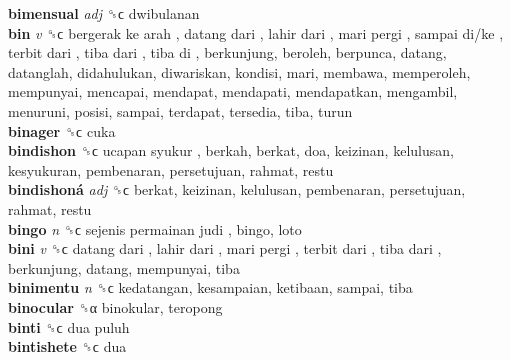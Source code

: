 \textbf{bimensual} \emph{adj}  ␝ϲ  dwibulanan  \\
\textbf{bin} \emph{v}  ␝ϲ   bergerak ke arah ,  datang dari ,  lahir dari ,  mari pergi ,  sampai di/ke ,  terbit dari ,  tiba dari ,  tiba di , berkunjung, beroleh, berpunca, datang, datanglah, didahulukan, diwariskan, kondisi, mari, membawa, memperoleh, mempunyai, mencapai, mendapat, mendapati, mendapatkan, mengambil, menuruni, posisi, sampai, terdapat, tersedia, tiba, turun  \\
\textbf{binager} ␝ϲ  cuka  \\
\textbf{bindishon} ␝ϲ   ucapan syukur , berkah, berkat, doa, keizinan, kelulusan, kesyukuran, pembenaran, persetujuan, rahmat, restu  \\
\textbf{bindishoná} \emph{adj}  ␝ϲ  berkat, keizinan, kelulusan, pembenaran, persetujuan, rahmat, restu  \\
\textbf{bingo} \emph{n}  ␝ϲ   sejenis permainan judi , bingo, loto  \\
\textbf{bini} \emph{v}  ␝ϲ   datang dari ,  lahir dari ,  mari pergi ,  terbit dari ,  tiba dari , berkunjung, datang, mempunyai, tiba  \\
\textbf{binimentu} \emph{n}  ␝ϲ  kedatangan, kesampaian, ketibaan, sampai, tiba  \\
\textbf{binocular} ␝α  binokular, teropong  \\
\textbf{binti} ␝ϲ   dua puluh   \\
\textbf{bintishete} ␝ϲ  dua  \\
